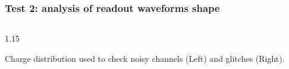 \documentclass{beamer}
\begin{document}
\begin{frame}




    \frametitle{Test 2: analysis of readout waveforms shape}
            \vspace{-4mm}
        \begin{columns}
    \begin{column}{1.15\framewidth}
        \setlength{\leftmargini}{1.2em}
     \begin{itemize}
    {\small \item Charge distribution used to check noisy channels (Left) and glitches (Right).}
      \end{itemize}
        \end{column}
        \end{columns}
    

\end{frame}
\end{document}
